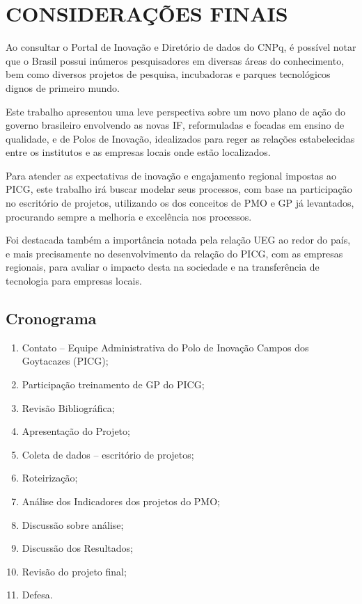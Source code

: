 \chapter{CONSIDERAÇÕES FINAIS}
\thispagestyle{empty}

Ao consultar o Portal de Inovação e Diretório de dados do CNPq, é possível notar que o Brasil possui inúmeros pesquisadores em diversas áreas do conhecimento, bem como diversos projetos de pesquisa, incubadoras e parques tecnológicos dignos de primeiro mundo.

Este trabalho apresentou uma leve perspectiva sobre um novo plano de ação do governo brasileiro envolvendo as novas IF, reformuladas e focadas em ensino de qualidade, e de Polos de Inovação, idealizados para reger as relações estabelecidas entre os institutos e as empresas locais onde estão localizados.

Para atender as expectativas de inovação e engajamento regional impostas ao PICG, este trabalho irá buscar modelar seus processos, com base na participação no escritório de projetos, utilizando os dos conceitos de PMO e GP já levantados, procurando sempre a melhoria e excelência nos processos.

Foi destacada também a importância notada pela relação UEG ao redor do país, e mais precisamente no desenvolvimento da relação do PICG, com as empresas regionais, para avaliar o impacto desta na sociedade e na transferência de tecnologia para empresas locais.

\newpage
\thispagestyle{empty}
\section{Cronograma}

\begin{enumerate}
  \item{Contato – Equipe Administrativa do Polo de Inovação Campos dos Goytacazes (PICG);}
  \item{Participação treinamento de GP do PICG;}
  \item{Revisão Bibliográfica;}
  \item{Apresentação do Projeto;}
  \item{Coleta de dados – escritório de projetos;}
  \item{Roteirização;}
  \item{Análise dos Indicadores dos projetos do PMO;}
  \item{Discussão sobre análise;}
  \item{Discussão dos Resultados;}
  \item{Revisão do projeto final;}
  \item{Defesa.}
\end{enumerate}

